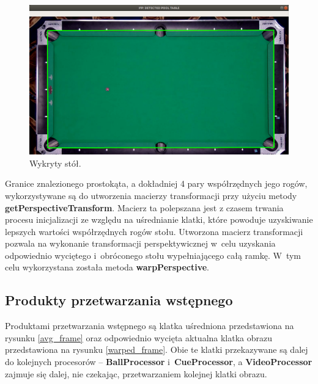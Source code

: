 \documentclass[12pt]{article}
\begin{document}
    \begin{figure}[!htb]
        \centering
        \includegraphics[width=15cm]{./images/obrazki/inicjalizacja/detected_pool_table.png}
        \caption{Wykryty stół.}
        \label{detected_pool_table}
    \end{figure}


    Granice znalezionego prostokąta, a dokładniej 4 pary współrzędnych jego rogów, wykorzystywane są do utworzenia macierzy transformacji przy użyciu metody \textbf{getPerspectiveTransform}\cite{getPerspectiveTransform}. Macierz ta polepszana jest z czasem trwania procesu inicjalizacji ze względu na uśrednianie klatki, które powoduje uzyskiwanie lepszych wartości współrzędnych rogów stołu. Utworzona macierz transformacji pozwala na wykonanie transformacji perspektywicznej w~celu uzyskania odpowiednio wyciętego i~obróconego stołu wypełniającego całą ramkę. W~tym celu wykorzystana została metoda \textbf{warpPerspective}\cite{warpPerspective}.  


\subsection{Produkty przetwarzania wstępnego}

Produktami przetwarzania wstępnego są klatka uśredniona przedstawiona na rysunku \ref{avg_frame} oraz odpowiednio wycięta aktualna klatka obrazu przedstawiona na rysunku \ref{warped_frame}. Obie te klatki przekazywane są dalej do kolejnych procesorów – \textbf{BallProcessor} i~\textbf{CueProcessor}, a \textbf{VideoProcessor} zajmuje się dalej, nie czekając, przetwarzaniem kolejnej klatki obrazu.
\end{document}
